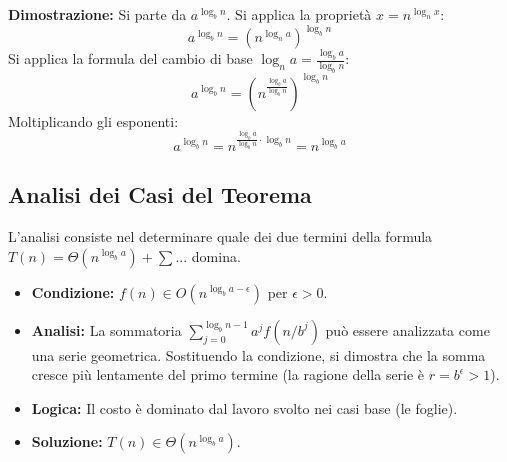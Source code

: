 \begin{observation}[Identità delle Foglie: $a^{\log_b n} = n^{\log_b a}$]
\textbf{Dimostrazione:}
Si parte da $a^{\log_b n}$. Si applica la proprietà $x = n^{\log_n x}$:
\[ a^{\log_b n} = (n^{\log_n a})^{\log_b n} \]
Si applica la formula del cambio di base $\log_n a = \frac{\log_b a}{\log_b n}$:
\[ a^{\log_b n} = \left( n^{\frac{\log_b a}{\log_b n}} \right)^{\log_b n} \]
Moltiplicando gli esponenti:
\[ a^{\log_b n} = n^{\frac{\log_b a}{\log_b n} \cdot \log_b n} = n^{\log_b a} \]
\end{observation}

\subsection{Analisi dei Casi del Teorema}
L'analisi consiste nel determinare quale dei due termini della formula $T(n) = \Theta(n^{\log_b a}) + \sum...$ domina.

\begin{definition}
\begin{itemize}
    \item \textbf{Condizione:} $f(n) \in O(n^{\log_b a - \epsilon})$ per $\epsilon > 0$.
    \item \textbf{Analisi:} La sommatoria $\sum_{j=0}^{\log_b n - 1} a^j f(n/b^j)$ può essere analizzata come una serie geometrica. Sostituendo la condizione, si dimostra che la somma cresce più lentamente del primo termine (la ragione della serie è $r = b^\epsilon > 1$).
    \item \textbf{Logica:} Il costo è dominato dal lavoro svolto nei casi base (le foglie).
    \item \textbf{Soluzione:} $T(n) \in \Theta(n^{\log_b a})$.
\end{itemize}
\end{definition}

